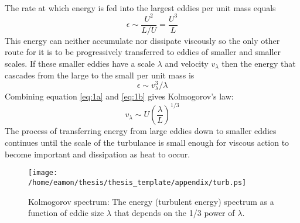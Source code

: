 \\
The rate at which energy is fed into the largest eddies per unit mass equals
\begin{equation}
\epsilon \sim \frac{U^2}{L/U} = \frac{U^3}{L}
\label{eq:1a}
\end{equation} 
This energy can neither accumulate nor dissipate viscously so the only other route for it is to be progressively transferred to eddies of smaller and smaller scales. If these smaller eddies have a scale $\lambda$ and velocity $v_{\lambda}$ then the energy that cascades from the large to the small per unit mass is
\begin{equation}
\epsilon \sim v_{\lambda}^3/\lambda
\label{eq:1b}
\end{equation}
Combining equation \ref{eq:1a} and \ref{eq:1b} gives Kolmogorov's law:
\begin{equation}
v_{\lambda} \sim U\left(\frac{\lambda}{L}\right)^{1/3}
\end{equation}
The process of transferring energy from large eddies down to smaller eddies continues until the scale of the turbulance is small enough for viscous action to become important and dissipation as heat to occur. 

\begin{figure}[!ht]
\centering 
         \texttt{[image: /home/eamon/thesis/thesis\_template/appendix/turb.ps]}
\caption[Kolmogorov spectrum]{Kolmogorov spectrum: The energy (turbulent energy) spectrum as a function of eddie size $\lambda$ that depends on the 1/3 power of $\lambda$.}
\label{fig:app4}
\end{figure}

